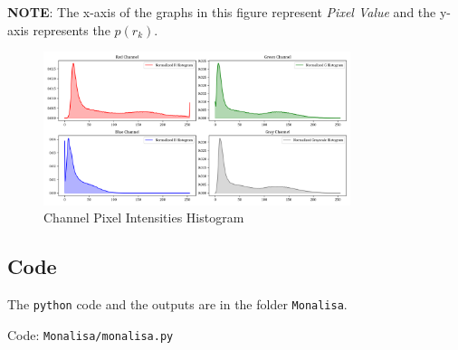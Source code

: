\documentclass{article}
\begin{document}
\textbf{NOTE}: The x-axis of the graphs in this figure represent \textit{Pixel Value} and 
the y-axis represents the \textit{$p(r_k)$}.
\begin{figure}[H]
    \centering
    \includegraphics[width=0.8\textwidth]{assets/monalisa/RGB_grayscale_channels_hist.png}
    \caption{Channel Pixel Intensities Histogram}
    \label{fig:RGB_grayscale_channels_hist}
\end{figure}

\subsection*{Code}
The \texttt{python} code and the outputs are in the
folder \texttt{Monalisa}.

Code: \texttt{Monalisa/monalisa.py}
\end{document}
